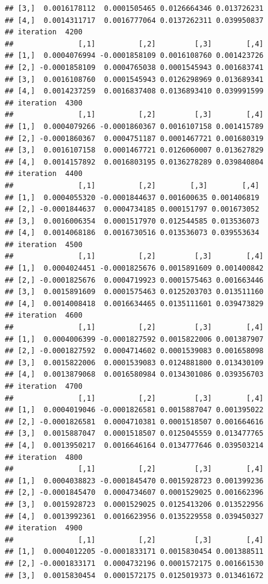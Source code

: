 \documentclass[
]{article}
\begin{document}
\begin{verbatim}
## [3,]  0.0016178112  0.0001505465 0.0126664346 0.013726231
## [4,]  0.0014311717  0.0016777064 0.0137262311 0.039950837
## iteration  4200 
##               [,1]          [,2]         [,3]        [,4]
## [1,]  0.0004076994 -0.0001858109 0.0016108760 0.001423726
## [2,] -0.0001858109  0.0004765038 0.0001545943 0.001683741
## [3,]  0.0016108760  0.0001545943 0.0126298969 0.013689341
## [4,]  0.0014237259  0.0016837408 0.0136893410 0.039991599
## iteration  4300 
##               [,1]          [,2]         [,3]        [,4]
## [1,]  0.0004079266 -0.0001860367 0.0016107158 0.001415789
## [2,] -0.0001860367  0.0004751187 0.0001467721 0.001680319
## [3,]  0.0016107158  0.0001467721 0.0126060007 0.013627829
## [4,]  0.0014157892  0.0016803195 0.0136278289 0.039840804
## iteration  4400 
##               [,1]          [,2]        [,3]        [,4]
## [1,]  0.0004055320 -0.0001844637 0.001600635 0.001406819
## [2,] -0.0001844637  0.0004734185 0.000151797 0.001673052
## [3,]  0.0016006354  0.0001517970 0.012544585 0.013536073
## [4,]  0.0014068186  0.0016730516 0.013536073 0.039553634
## iteration  4500 
##               [,1]          [,2]         [,3]        [,4]
## [1,]  0.0004024451 -0.0001825676 0.0015891609 0.001400842
## [2,] -0.0001825676  0.0004719923 0.0001575463 0.001663446
## [3,]  0.0015891609  0.0001575463 0.0125203703 0.013511160
## [4,]  0.0014008418  0.0016634465 0.0135111601 0.039473829
## iteration  4600 
##               [,1]          [,2]         [,3]        [,4]
## [1,]  0.0004006399 -0.0001827592 0.0015822006 0.001387907
## [2,] -0.0001827592  0.0004714602 0.0001539083 0.001658098
## [3,]  0.0015822006  0.0001539083 0.0124881800 0.013430109
## [4,]  0.0013879068  0.0016580984 0.0134301086 0.039356703
## iteration  4700 
##               [,1]          [,2]         [,3]        [,4]
## [1,]  0.0004019046 -0.0001826581 0.0015887047 0.001395022
## [2,] -0.0001826581  0.0004710381 0.0001518507 0.001664616
## [3,]  0.0015887047  0.0001518507 0.0125045559 0.013477765
## [4,]  0.0013950217  0.0016646164 0.0134777646 0.039503214
## iteration  4800 
##               [,1]          [,2]         [,3]        [,4]
## [1,]  0.0004038823 -0.0001845470 0.0015928723 0.001399236
## [2,] -0.0001845470  0.0004734607 0.0001529025 0.001662396
## [3,]  0.0015928723  0.0001529025 0.0125413206 0.013522956
## [4,]  0.0013992361  0.0016623956 0.0135229558 0.039450327
## iteration  4900 
##               [,1]          [,2]         [,3]        [,4]
## [1,]  0.0004012205 -0.0001833171 0.0015830454 0.001388511
## [2,] -0.0001833171  0.0004732196 0.0001572175 0.001661530
## [3,]  0.0015830454  0.0001572175 0.0125019373 0.013461672

\end{verbatim}
\end{document}

